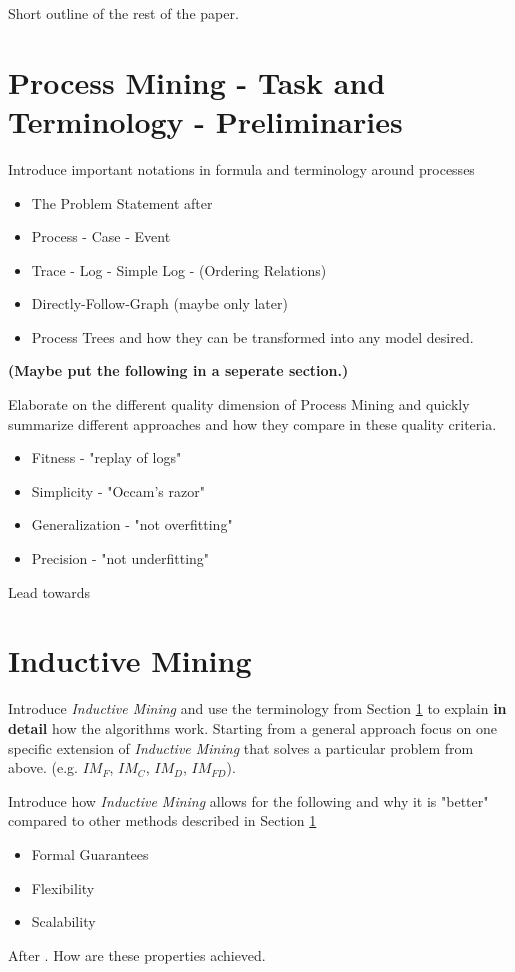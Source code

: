\documentclass[a4paper]{IEEEtran}
\begin{document}
Short outline of the rest of the paper.

\section{Process Mining - Task and Terminology - Preliminaries}
\label{sec:terminology}
Introduce important notations in formula and terminology around processes
\begin{itemize}
    \item The Problem Statement after \cite{process_mining}
    \item Process - Case - Event 
    \item Trace - Log - Simple Log - (Ordering Relations) 
    \item Directly-Follow-Graph (maybe only later)
    \item Process Trees and how they can be transformed into any model desired. 
\end{itemize}
\textbf{(Maybe put the following in a seperate section.)}


Elaborate on the different quality dimension of Process Mining and quickly summarize different approaches and how they compare in these quality criteria.
\begin{itemize}
    \item Fitness - "replay of logs"
    \item Simplicity - "Occam's razor" 
    \item Generalization - "not overfitting" 
    \item Precision - "not underfitting" 
\end{itemize}
Lead towards 

\section{Inductive Mining}
\label{sec:inductivemining}
Introduce \textit{Inductive Mining} and use the terminology from Section \ref{sec:terminology} to explain \textbf{in detail} how the algorithms work. Starting from a general approach focus on one specific extension of \textit{Inductive Mining} that solves a particular problem from above. (e.g. $IM_F$, $IM_C$, $IM_D$, $IM_{FD}$).

Introduce how \textit{Inductive Mining} allows for the following and why it is "better" compared to other methods described in Section \ref{sec:terminology}
\begin{itemize}
    \item Formal Guarantees
    \item Flexibility 
    \item Scalability
\end{itemize} 
After \cite{process_mining}. How are these properties achieved. 
\end{document}

